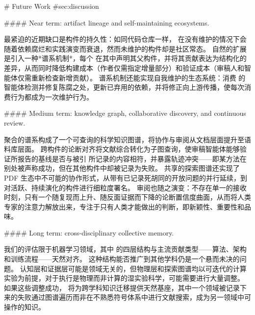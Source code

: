 \begin{markdown}
# Future Work {#sec:discussion}

#### Near term: artifact lineage and self-maintaining ecosystems.

最紧迫的近期缺口是构件的持久性：如同代码仓库一样，\ara{} 在没有维护的情况下会随着依赖腐烂和实践演变而衰退，然而未维护的构件却是社区常态。
自然的扩展是引入一种*谱系机制*，每个 \ara{} 在其中声明其父构件，并将其贡献表达为结构化的差异，从而同时降低构建成本（作者仅需指定增量部分）和验证成本（审稿人和智能体仅需重新检查新增贡献）。
谱系机制还能实现自我维护的生态系统：消费 \ara{} 的智能体检测并修复陈腐之处，更新已弃用的依赖，并将修正向上游传播，使每次消费行为都成为一次维护行为。

#### Medium term: knowledge graph, collaborative discovery, and continuous review.

聚合的谱系构成了一个可查询的科学知识图谱，将协作与审阅从文档层面提升至语料库层面。
跨构件的论断对齐将文献综合转化为子图查询，使审稿智能体能够验证所报告的基线是否与被引 \ara{} 所记录的内容相符，并暴露轨迹冲突——即某方法在别处被声称成功，但在其他构件中却被记录为失败。
共享的探索图谱还实现了 PDF 生态中不可能的协作形式，从带有已记录死胡同的开放问题的并行延续，到对活跃、持续演化的构件进行细粒度署名。
审阅也随之演变：不存在单一的接收时刻，只有一个随复现而上升、随反面证据而下降的论断置信度曲面，从而将人类专家的注意力解放出来，专注于只有人类才能做出的判断，即新颖性、重要性和品味。

#### Long term: cross-disciplinary collective memory.

我们的评估限于机器学习领域，其中 \ara{} 的四层结构与主流贡献类型——算法、架构和训练流程——天然对齐。
这种结构能否推广到其他学科仍是一个悬而未决的问题。
认知层和证据层可能是领域无关的，但物理层和探索图谱均以可迭代的计算实验为前提，对于执行是物理而非计算的湿实验科学，可能需要进行大量调整。
如果这些调整成功，\ara{} 将为跨学科知识迁移提供天然基座，其中一个领域被记录下来的失败通过图谱遍历而非在不熟悉符号体系中进行文献搜索，成为另一领域中可操作的知识。
\end{markdown}
